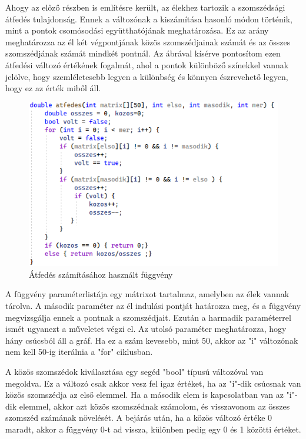 Ahogy az előző részben is említésre került, az élekhez tartozik a szomszédsági átfedés tulajdonság. Ennek a változónak a kiszámítása hasonló módon történik, mint a pontok csomósodási együtthatójának meghatározása. Ez az arány meghatározza az él két végpontjának közös szomszédjainak számát és az összes szomszédjának számát mindkét pontnál. Az ábrával kísérve pontosítom ezen átfedési változó értékének fogalmát, ahol a pontok különböző színekkel vannak jelölve, hogy szemléletesebb legyen a különbség és könnyen észrevehető legyen, hogy ez az érték miből áll.

\begin{figure}[h]
    \centering
    \includegraphics[scale=0.6]{images/atfedesikod}
    \caption{Átfedés számításához használt függvény}
    \label{fig:enter-label}
\end{figure}


A függvény paraméterlistája egy mátrixot tartalmaz, amelyben az élek vannak tárolva. A második paraméter az él indulási pontját határozza meg, és a függvény megvizsgálja ennek a pontnak a szomszédjait. Ezután a harmadik paraméterrel ismét ugyanezt a műveletet végzi el. Az utolsó paraméter meghatározza, hogy hány csúcsból áll a gráf. Ha ez a szám kevesebb, mint 50, akkor az "i" változónak nem kell 50-ig iterálnia a "for" ciklusban.

A közös szomszédok kiválasztása egy segéd "bool" típusú változóval van megoldva. Ez a változó csak akkor vesz fel igaz értéket, ha az "i"-dik csúcsnak van közös szomszédja az első elemmel. Ha a második elem is kapcsolatban van az "i"-dik elemmel, akkor azt közös szomszédnak számolom, és visszavonom az összes szomszéd számának növelését. A bejárás után, ha a közös változó értéke 0 maradt, akkor a függvény 0-t ad vissza, különben pedig egy 0 és 1 közötti értéket.
